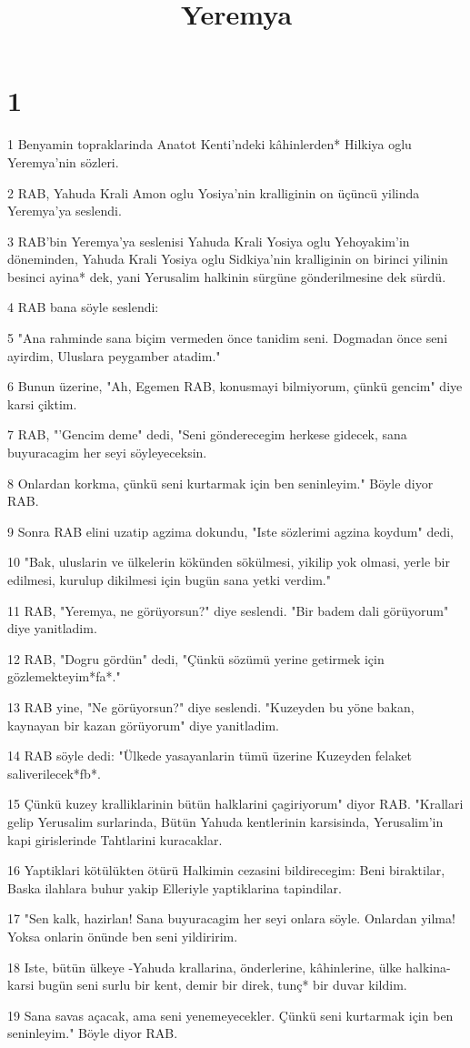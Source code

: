 

\title{Yeremya}


\chapter{1}

\par 1 Benyamin topraklarinda Anatot Kenti'ndeki kâhinlerden* Hilkiya oglu Yeremya'nin sözleri.
\par 2 RAB, Yahuda Krali Amon oglu Yosiya'nin kralliginin on üçüncü yilinda Yeremya'ya seslendi.
\par 3 RAB'bin Yeremya'ya seslenisi Yahuda Krali Yosiya oglu Yehoyakim'in döneminden, Yahuda Krali Yosiya oglu Sidkiya'nin kralliginin on birinci yilinin besinci ayina* dek, yani Yerusalim halkinin sürgüne gönderilmesine dek sürdü.
\par 4 RAB bana söyle seslendi:
\par 5 "Ana rahminde sana biçim vermeden önce tanidim seni. Dogmadan önce seni ayirdim, Uluslara peygamber atadim."
\par 6 Bunun üzerine, "Ah, Egemen RAB, konusmayi bilmiyorum, çünkü gencim" diye karsi çiktim.
\par 7 RAB, "'Gencim deme" dedi, "Seni gönderecegim herkese gidecek, sana buyuracagim her seyi söyleyeceksin.
\par 8 Onlardan korkma, çünkü seni kurtarmak için ben seninleyim." Böyle diyor RAB.
\par 9 Sonra RAB elini uzatip agzima dokundu, "Iste sözlerimi agzina koydum" dedi,
\par 10 "Bak, uluslarin ve ülkelerin kökünden sökülmesi, yikilip yok olmasi, yerle bir edilmesi, kurulup dikilmesi için bugün sana yetki verdim."
\par 11 RAB, "Yeremya, ne görüyorsun?" diye seslendi. "Bir badem dali görüyorum" diye yanitladim.
\par 12 RAB, "Dogru gördün" dedi, "Çünkü sözümü yerine getirmek için gözlemekteyim*fa*."
\par 13 RAB yine, "Ne görüyorsun?" diye seslendi. "Kuzeyden bu yöne bakan, kaynayan bir kazan görüyorum" diye yanitladim.
\par 14 RAB söyle dedi: "Ülkede yasayanlarin tümü üzerine Kuzeyden felaket saliverilecek*fb*.
\par 15 Çünkü kuzey kralliklarinin bütün halklarini çagiriyorum" diyor RAB. "Krallari gelip Yerusalim surlarinda, Bütün Yahuda kentlerinin karsisinda, Yerusalim'in kapi girislerinde Tahtlarini kuracaklar.
\par 16 Yaptiklari kötülükten ötürü Halkimin cezasini bildirecegim: Beni biraktilar, Baska ilahlara buhur yakip Elleriyle yaptiklarina tapindilar.
\par 17 "Sen kalk, hazirlan! Sana buyuracagim her seyi onlara söyle. Onlardan yilma! Yoksa onlarin önünde ben seni yildiririm.
\par 18 Iste, bütün ülkeye -Yahuda krallarina, önderlerine, kâhinlerine, ülke halkina- karsi bugün seni surlu bir kent, demir bir direk, tunç* bir duvar kildim.
\par 19 Sana savas açacak, ama seni yenemeyecekler. Çünkü seni kurtarmak için ben seninleyim." Böyle diyor RAB.

